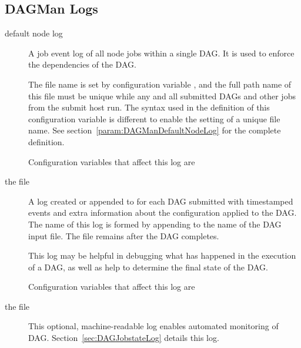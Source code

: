 \subsection{\label{sec:DAGMan-logs}DAGMan Logs}
\begin{description}

\item[default node log]
  A job event log of all node jobs within a single DAG.
  It is used to enforce the dependencies of the DAG.

  The file name is set by configuration variable 
  , 
  and the full path name of this file must be unique while any and 
  all submitted DAGs  and other jobs from the submit host run.
  The syntax used in the definition of this configuration variable is
  different to enable the setting of a unique file name.
  See section~\ref{param:DAGManDefaultNodeLog} for the complete definition.

  Configuration variables that affect this log are
  \begin{description}
  \item [] 
  \end{description}

\item[the  file]
  A log created or appended to for each DAG submitted with timestamped
  events and extra information about the configuration applied to the DAG.
  The name of this log is formed by appending  to
  the name of the DAG input file.  The file remains after the DAG completes.

  This log may be helpful in debugging what has happened in the execution
  of a DAG, as well as help to determine the final state of the DAG.

  Configuration variables that affect this log are
  \begin{description}
  \item [] 
  \item [] 
  \end{description}

\item[the  file]
  This optional, machine-readable log enables automated monitoring of DAG.
  Section~\ref{sec:DAGJobstateLog} details this log.
  

\end{description}

